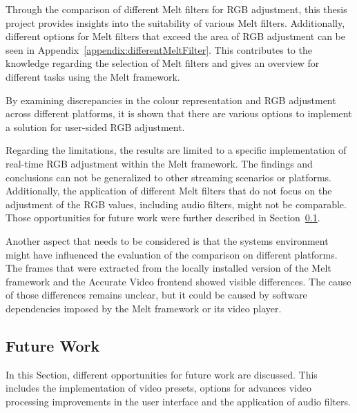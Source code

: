 \documentclass[../MasterThesis.tex]{subfiles}
\begin{document}
Through the comparison of different Melt filters for RGB adjustment, this thesis project provides insights into the suitability of various Melt filters. Additionally, different options for Melt filters that exceed the area of RGB adjustment can be seen in Appendix~\ref{appendix:differentMeltFilter}.
This contributes to the knowledge regarding the selection of Melt filters and gives an overview for different tasks using the Melt framework.


By examining discrepancies in the colour representation and RGB adjustment across different platforms, it is shown that there are various options to implement a solution for user-sided RGB adjustment.


Regarding the limitations, the results are limited to a specific implementation of real-time RGB adjustment within the Melt framework. The findings and conclusions can not be generalized to other streaming scenarios or platforms. 
Additionally, the application of different Melt filters that do not focus on the adjustment of the RGB values, including audio filters, might not be comparable. 
Those opportunities for future work were further described in Section~\ref{subsection:futurework}.


Another aspect that needs to be considered is that the systems environment might have influenced the evaluation of the comparison on different platforms. The frames that were extracted from the locally installed version of the Melt framework and the Accurate Video frontend showed visible differences. The cause of those differences remains unclear, but it could be caused by software dependencies imposed by the Melt framework or its video player.

	

	
	
	
	





\subsection{Future Work} \label{subsection:futurework}


In this Section, different opportunities for future work are discussed. This includes the implementation of video presets, options for advances video processing improvements in the user interface and the application of audio filters.
\end{document}

